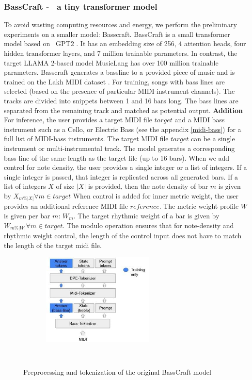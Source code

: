 \subsubsection{BassCraft -  a tiny transformer model}
To avoid wasting computing resources and energy, we perform the preliminary experiments on a smaller model: Basscraft. BassCraft is a small transformer model based on  GPT2 \cite{Radford_Wu_Child_Luan_gpt2_2019}. It has an embedding size of 256, 4 attention heads, four hidden transformer layers, and 7 million trainable parameters. In contrast, the target LLAMA 2-based model MusicLang has over 100 million trainable parameters. Basscraft generates a bassline to a provided piece of music and is trained on the Lakh MIDI dataset \cite{Raffel_2016}. For training, songs with bass lines are selected (based on the presence of particular MIDI-instrument channels). The tracks are divided into snippets between 1 and 16 bars long. The bass lines are separated from the remaining track and matched as potential output. 
\textbf{Addition} For inference, the user provides a target MIDI file $target$ and a MIDI bass instrument such as a Cello, or Electric Bass (see the appendix \ref{midi-bass}) for a full list of MIDI-bass instruments. The target MIDI file $target$ can be a single instrument or multi-instrumental track. The model generates a corresponding bass line of the same length as the target file (up to 16 bars). When we add control for note density, the user provides a single integer or a list of integers. If a single integer is passed, that integer is replicated across all generated bars. If a list of integers $X$ of size $|X|$ is provided, then the note density of bar $m$ is given by $X_{m\%|X|} \forall m \in target$
When control is added for inner metric weight, the user provides an additional reference MIDI file $reference$. The metric weight profile $W$ is given per bar $m$: $W_{m}$. The target rhythmic weight of a bar is given by $W_{m\%|W|} \forall m \in target$. The modulo operation ensures that for note-density and rhythmic weight control, the length of the control input does not have to match the length of the target midi file.    

\begin{figure}[H]
    \centering
    \includegraphics[width=0.5\textwidth]{IMAGES/Preprocessing1.jpg} 
    \caption{Preprocessing and tokenization of the original BassCraft model}
    \label{fig:preprocessing1}
\end{figure}

